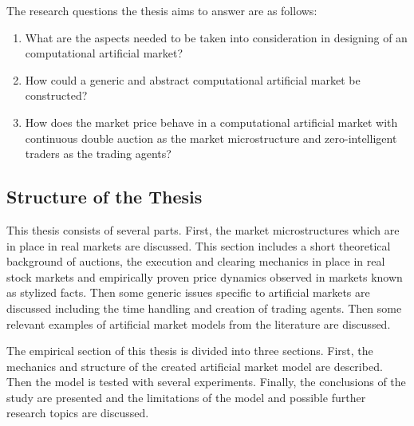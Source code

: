 The research questions the thesis aims to answer are as follows:
\begin{enumerate}
    \item What are the aspects needed to be taken into consideration in designing of an computational 
          artificial market?
	\item How could a generic and abstract computational artificial market be constructed?
    \item How does the market price behave in a computational artificial market with continuous
          double auction as the market microstructure and zero-intelligent traders as the 
          trading agents?
\end{enumerate}


\subsection{Structure of the Thesis}
This thesis consists of several parts. First, the market microstructures which are in place in real 
markets are discussed. This section includes a short theoretical background of auctions, the execution and clearing mechanics in place in real
stock markets and empirically proven price dynamics observed in markets known as stylized
facts. Then some generic issues specific to artificial markets are discussed including the time handling and creation
of trading agents. Then some relevant examples of artificial market models from the literature are discussed. 

The empirical section of this thesis is divided into three sections. First, the mechanics and
structure of the created artificial market model are described. Then the model is tested
with several experiments. Finally, the conclusions of the study are presented and the limitations of the model and
possible further research topics are discussed.